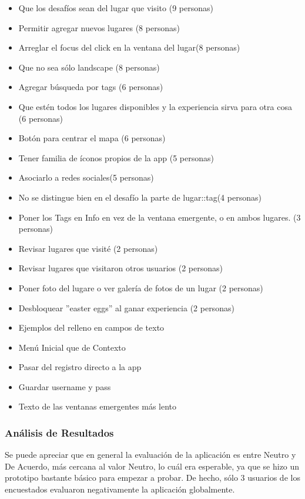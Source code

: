 \documentclass[10pt,letterpaper]{article}
\begin{document}
\begin{itemize}
\item Que los desafíos sean del lugar que visito (9 personas)
\item Permitir agregar nuevos lugares (8 personas)
\item Arreglar el focus del click en la ventana del lugar(8 personas)
\item Que no sea sólo landscape (8 personas)
\item Agregar búsqueda por tags (6 personas)
\item Que estén todos los lugares disponibles y la experiencia sirva para otra cosa (6 personas)
\item Botón para centrar el mapa (6 personas)
\item Tener familia de íconos propios de la app (5 personas)
\item Asociarlo a redes sociales(5 personas)
\item No se distingue bien en el desafío la parte de lugar::tag(4 personas)
\item Poner los Tags en Info en vez de la ventana emergente, o en ambos lugares. (3 personas)
\item Revisar lugares que visité (2 personas)
\item Revisar lugares que visitaron otros usuarios (2 personas)
\item Poner foto del lugare o ver galería de fotos de un lugar (2 personas)
\item Desbloquear ''easter eggs'' al ganar experiencia (2 personas)
\item Ejemplos del relleno en campos de texto
\item Menú Inicial que de Contexto
\item Pasar del registro directo a la app
\item Guardar username y pass
\item Texto de las ventanas emergentes más lento
\end{itemize}

\subsubsection{Análisis de Resultados}

Se puede apreciar que en general la evaluación de la aplicación es entre Neutro y De Acuerdo, más cercana al valor Neutro, lo cuál era esperable, ya que se hizo un prototipo bastante básico para empezar a probar. De hecho, sólo 3 usuarios de los encuestados evaluaron negativamente la aplicación globalmente.\\
\end{document}
